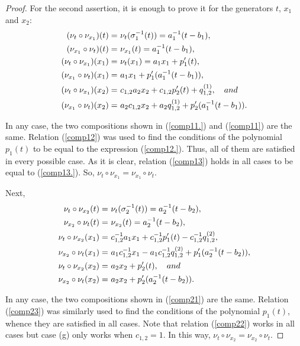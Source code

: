 \documentclass{amsart}
\theoremstyle{definition}
\theoremstyle{remark}
\numberwithin{equation}{section}
\begin{document}
\begin{proof}
For the second assertion, it is enough to prove it for the generators $t$, $x_1$ and $x_2$:
\begin{align}
    (\nu_t \circ \nu_{x_1})(t) = &\ \nu_t(\sigma_1^{-1}(t))=a_1^{-1}(t-b_1), \label{comp11.} \\
    (\nu_{x_1} \circ \nu_t)(t) = &\ \nu_{x_1}(t) = a_1^{-1}(t-b_1), \label{comp11} \\
    (\nu_t \circ \nu_{x_1})(x_1) = &\ \nu_t(x_1)=a_1x_1+p_1'(t), \label{comp12.}\\ 
    (\nu_{x_1} \circ \nu_t)(x_1) = &\  a_1x_1+p_1'(a_1^{-1}(t-b_1)),\label{comp12} \\
    (\nu_t \circ \nu_{x_1})(x_2) = &\ c_{1,2}a_2x_2+c_{1,2}p_2'(t)+q_{1,2}^{(1)}, \quad {\rm and} \label{comp13.} \\  
 (\nu_{x_1} \circ \nu_t)(x_2) = &\ a_2c_{1,2}x_2+a_2q_{1,2}^{(1)} + p_2'(a_{1}^{-1}(t-b_1)). \label{comp13}
\end{align}

In any case, the two compositions shown in {\rm (}\ref{comp11.}{\rm )} and {\rm (}\ref{comp11}{\rm )} are the same. Relation {\rm (}\ref{comp12}{\rm )} was used to find the conditions of the polynomial $p_1(t)$ to be equal to the expression {\rm (}\ref{comp12.}{\rm )}. Thus, all of them are satisfied in every possible case.  As it is clear, relation {\rm (}\ref{comp13}{\rm )} holds in all cases to be equal to {\rm (}\ref{comp13.}{\rm )}. So, $\nu_{t}\circ\nu_{x_1}=\nu_{x_1}\circ\nu_{t}$.

Next, 
\begin{align}
    \nu_t \circ \nu_{x_2}(t) = &\ \nu_t(\sigma_2^{-1}(t))=a_2^{-1}(t-b_2), \notag \\
    \nu_{x_2} \circ \nu_t(t) = &\ \nu_{x_2}(t) = a_2^{-1}(t-b_2), \label{comp21} \\ 
     \nu_t \circ \nu_{x_2}(x_1) = &\ c_{1,2}^{-1}a_1x_1+c_{1,2}^{-1}p_1'(t)-c_{1,2}^{-1}q_{1,2}^{(2)}, \notag \\
     \nu_{x_2} \circ \nu_t(x_1) = &\ a_1c_{1,2}^{-1}x_1-a_1c_{1,2}^{-1}q_{1,2}^{(2)}+p_1'(a_{2}^{-1}(t-b_2)), \label{comp22} \\
     \nu_t \circ \nu_{x_2}(x_2) = &\ a_2x_2+p_2'(t), \quad {\rm and} \notag \\
     \nu_{x_2} \circ \nu_t(x_2) = &\ a_2x_2+p_2'(a_2^{-1}(t-b_2)). \label{comp23}
\end{align}

In any case, the two compositions shown in {\rm (}\ref{comp21}{\rm )} are the same. Relation {\rm (}\ref{comp23}{\rm )} was similarly used to find the conditions of the polynomial $p_1(t)$, whence they are satisfied in all cases. Note that relation {\rm (}\ref{comp22}{\rm )} works in all cases but case {\rm (}g{\rm )} only works when $c_{1,2}=1$. In this way, $\nu_{t}\circ\nu_{x_2}=\nu_{x_2}\circ\nu_{t}$.


\end{proof}
\end{document}
